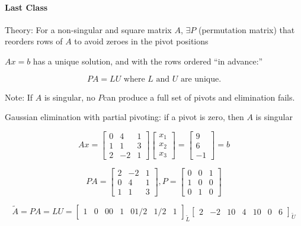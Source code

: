 \documentclass[12pt]{article}
\newcommand{\<}{\langle}
\renewcommand{\>}{\rangle}
\begin{document}
\paragraph{Last Class} Theory: For a non-singular and square matrix $A$, $\exists P$ (permutation matrix) that reorders rows of $A$ to avoid zeroes in the pivot positions

$Ax=b$ has a unique solution, and with the rows ordered ``in advance:''

\[
	P A = L U \text{ where } L \text{ and } U \text{ are unique.}
\]

Note: If $A$ is singular, no $P$can produce a full set of pivots and elimination fails.

Gaussian elimination with partial pivoting: if a pivot is zero, then $A$ is singular

\[
	A x = 
	\begin{bmatrix}
		0 & 4 & 1 \\
		1 & 1 & 3 \\
		2 & -2 & 1
	\end{bmatrix}
	\begin{bmatrix}
		x_1 \\ x_2 \\ x_3
	\end{bmatrix} = 
	\begin{bmatrix}
		9 \\ 6 \\ -1
	\end{bmatrix} = 
	b
\]

\[
	PA =
	\begin{bmatrix}
		2 & -2 & 1 \\
		0 & 4 & 1 \\
		1 & 1 & 3
	\end{bmatrix},
	P = 
	\begin{bmatrix}
		0 & 0 & 1 \\
		1 & 0 & 0 \\
		0 & 1 & 0
	\end{bmatrix}
\]

\[
	\tilde{A} = PA = LU = 
	\begin{bmatrix}
		1 & 0 & 0
		0 & 1 & 0
		1/2 & 1/2 & 1
	\end{bmatrix}_{\tilde{L}}
	\begin{bmatrix}
		2 & -2 & 1
		0 & 4 & 1
		0 & 0 & 6
	\end{bmatrix}_{\tilde{U}}
\]

\end{document}
